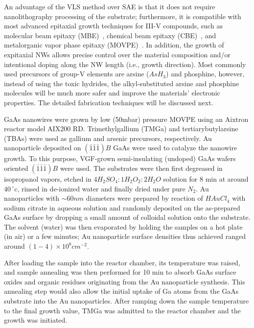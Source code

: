 An advantage of the VLS method over SAE is that it does not require
nanolithography processing of the substrate; furthermore, it is compatible with
most advanced epitaxial growth techniques for III-V compounds, such as
molecular beam epitaxy (MBE)~\cite{Zhao:2009cg,colombo2008ga}, chemical beam
epitaxy (CBE)~\cite{ercolani2009inas}, and metalorganic vapor phase epitaxy
(MOVPE)~\cite{Noborisaka:2005hh,paiano2006size}. In addition, the growth of
expitaxial NWs allows precise control over the material composition and/or
intentional doping along the NW length (i.e., growth direction). Most commonly
used precursors of group-V elements are arsine ($AsH_3$) and phosphine,
however, instead of using the toxic hydrides, the alkyl-substituted arsine and
phosphine molecules will be much more safer and improve the materials'
electronic properties. The detailed fabrication techniques will be discussed
next.

GaAs nanowires were grown by low (50mbar) pressure MOVPE using an Aixtron
reactor model AIX200 RD. Trimethylgallium (TMGa) and tertiarybutylarsine (TBAs)
were used as gallium and arsenic precursors, respectively. Au nanoparticle
deposited on $(\bar{1}\bar{1}\bar{1})B$ GaAs were used to catalyze the nanowire
growth. To this purpose, VGF-grown semi-insulating (undoped) GaAs wafers
oriented $(\bar{1}\bar{1}\bar{1})B$ were used. The substrates were then first
degreased in isopropanol vapors, etched in $4H_2SO_4:1H_2O_2:2H_2O$ solution
for 8 min at around $40\,^{\circ}\mathrm{c}$, rinsed in de-ionized water and
finally dried under pure $N_2$. Au nanoparticles with $\sim 60 nm$ diameters
were prepared by reaction of $HAuCl_4$ with sodium citrate in aqueous solution
and randomly deposited on the as-prepared GaAs surface by dropping a small
amount of colloidal solution onto the substrate. The solvent (water) was then
evaporated by holding the samples on a hot plate (in air) or a few minutes; Au
nanoparticle surface densities thus achieved ranged around
$(1-4)\times{10}^8{cm}^{-2}$.

After loading the sample into the reactor chamber, its temperature was raised,
and sample annealing was then performed for 10 min to absorb GaAs surface
oxides and organic residues originating from the Au nanoparticle synthesis.
This annealing step would also allow the initial uptake of Ga atoms from the
GaAs substrate into the Au nanoparticles. After ramping down the sample
temperature to the final growth value, TMGa was admitted to the reactor chamber
and the growth was initiated.


